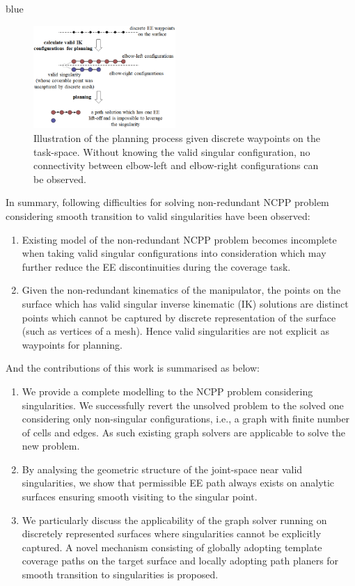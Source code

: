 \documentclass[Afour,sageh,times]{sagej}
\begin{document}
\begin{color}{blue}
\begin{figure}[t]
\includegraphics[width=0.48\textwidth]{figures/other_figures/discrete_2dof_demo}
\caption{Illustration of the planning process given discrete waypoints on the task-space. 
Without knowing the valid singular configuration, no connectivity between elbow-left and elbow-right configurations can be observed. }\label{fig:discrete_2dof_demo}
\end{figure}

In summary, following difficulties for solving non-redundant NCPP problem considering smooth transition to valid singularities have been observed: 

\begin{enumerate}
\item Existing model of the non-redundant NCPP problem becomes incomplete when taking valid singular configurations into consideration which may further reduce the EE discontinuities during the coverage task. 
\item Given the non-redundant kinematics of the manipulator, the points on the surface which has valid singular inverse kinematic (IK) solutions are distinct points which cannot be captured by discrete representation of the surface (such as vertices of a mesh). 
Hence valid singularities are not explicit as waypoints for planning. 
\end{enumerate}
And the contributions of this work is summarised as below: 
\begin{enumerate}
\item We provide a complete modelling to the NCPP problem considering singularities. 
We successfully revert the unsolved problem to the solved one considering only non-singular configurations, i.e., a graph with finite number of cells and edges. As such existing graph solvers are applicable to solve the new problem. 
\item By analysing the geometric structure of the joint-space near valid singularities, we show that permissible EE path always exists on analytic surfaces ensuring smooth visiting to the singular point. 
\item We particularly discuss the applicability of the graph solver running on discretely represented surfaces where singularities cannot be explicitly captured. 
A novel mechanism consisting of globally adopting template coverage paths on the target surface and locally adopting path planers for smooth transition to singularities is proposed.  
\end{enumerate}


\end{color}
\end{document}
